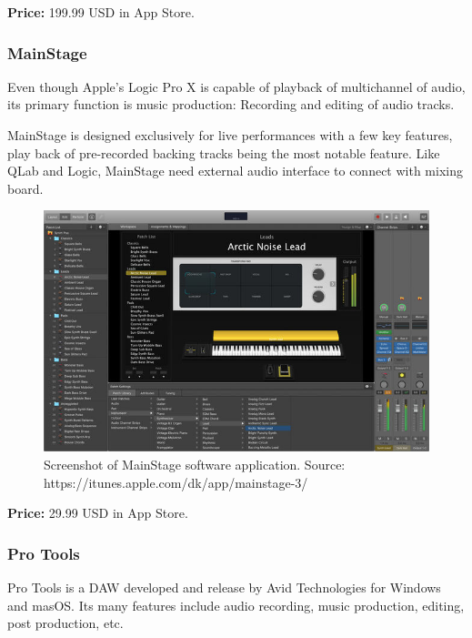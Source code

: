 \textbf{Price:} 199.99 USD in App Store. \\

\subsubsection{MainStage}
Even though Apple's Logic Pro X is capable of playback of multichannel of audio, its primary function is music production: Recording and editing of audio tracks. \newline

MainStage is designed exclusively for live performances with a few key features, play back of pre-recorded backing tracks being the most notable feature. Like QLab and Logic, MainStage need external audio interface to connect with mixing board. \\
 
\begin{figure}[H]
\centering
\includegraphics[scale=0.4]{./pictures/mainstage.png}
\caption{Screenshot of MainStage software application. Source: https://itunes.apple.com/dk/app/mainstage-3/}
\label{fig:mainstage.png}
\end{figure}

\textbf{Price:} 29.99 USD in App Store. \\

\subsubsection{Pro Tools}
Pro Tools is a DAW developed and release by Avid Technologies for Windows and masOS. Its many features include audio recording, music production, editing, post production, etc. \newline

